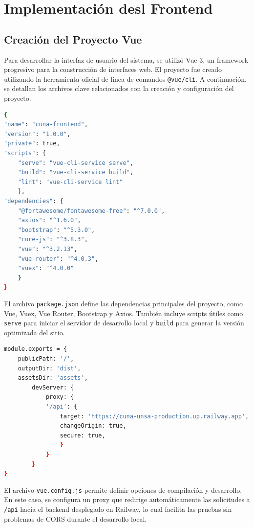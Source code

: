\documentclass{article}
\begin{document}


\section{Implementación desl Frontend}
    \subsection{Creación del Proyecto Vue}

        Para desarrollar la interfaz de usuario del sistema, se utilizó Vue 3, un framework progresivo para la construcción de interfaces web. El proyecto fue creado utilizando la herramienta oficial de línea de comandos \texttt{@vue/cli}. A continuación, se detallan los archivos clave relacionados con la creación y configuración del proyecto.

        \begin{lstlisting}[language=bash, caption={package.json - Configuración del Proyecto}]
{
"name": "cuna-frontend",
"version": "1.0.0",
"private": true,
"scripts": {
    "serve": "vue-cli-service serve",
    "build": "vue-cli-service build",
    "lint": "vue-cli-service lint"
    },
"dependencies": {
    "@fortawesome/fontawesome-free": "^7.0.0",
    "axios": "^1.6.0",
    "bootstrap": "^5.3.0",
    "core-js": "^3.8.3",
    "vue": "^3.2.13",
    "vue-router": "^4.0.3",
    "vuex": "^4.0.0"
    }
}
        \end{lstlisting}

        El archivo \texttt{package.json} define las dependencias principales del proyecto, como Vue, Vuex, Vue Router, Bootstrap y Axios. También incluye scripts útiles como \texttt{serve} para iniciar el servidor de desarrollo local y \texttt{build} para generar la versión optimizada del sitio.

        \begin{lstlisting}[language=bash, caption={vue.config.js - Proxy de Desarrollo}]
module.exports = {
    publicPath: '/',
    outputDir: 'dist',
    assetsDir: 'assets',
        devServer: {
            proxy: {
            '/api': {
                target: 'https://cuna-unsa-production.up.railway.app',
                changeOrigin: true,
                secure: true,
                }
            }
        }
}
        \end{lstlisting}

        El archivo \texttt{vue.config.js} permite definir opciones de compilación y desarrollo. En este caso, se configura un proxy que redirige automáticamente las solicitudes a \texttt{/api} hacia el backend desplegado en Railway, lo cual facilita las pruebas sin problemas de CORS durante el desarrollo local.
\end{document}
